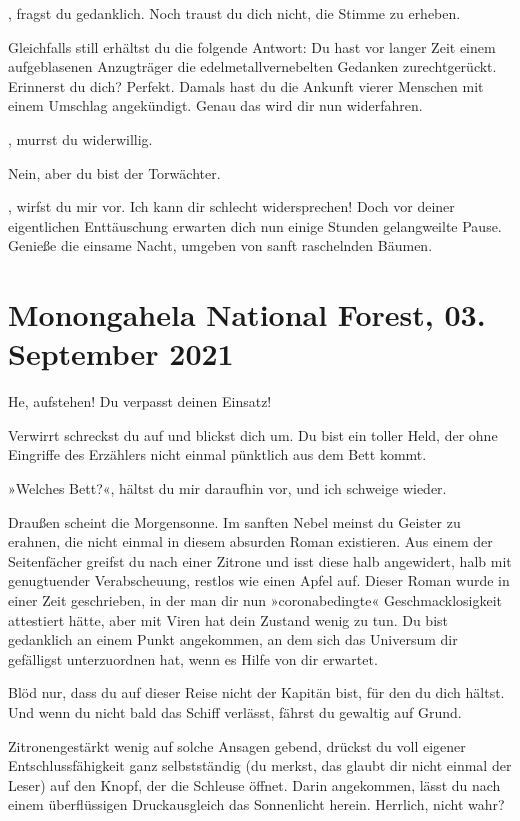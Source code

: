 , fragst du gedanklich. Noch traust du dich nicht, die Stimme zu erheben.

Gleichfalls still erhältst du die folgende Antwort: Du hast vor langer Zeit einem aufgeblasenen Anzugträger die edelmetallvernebelten Gedanken zurechtgerückt. Erinnerst du dich? Perfekt. Damals hast du die Ankunft vierer Menschen mit einem Umschlag angekündigt. Genau das wird dir nun widerfahren.

, murrst du widerwillig.

Nein, aber du bist der Torwächter.

, wirfst du mir vor. Ich kann dir schlecht widersprechen! Doch vor deiner eigentlichen Enttäuschung erwarten dich nun einige Stunden gelangweilte Pause. Genieße die einsame Nacht, umgeben von sanft raschelnden Bäumen.


\chapter{Monongahela National Forest, 03. September 2021}

He, aufstehen! Du verpasst deinen Einsatz!

Verwirrt schreckst du auf und blickst dich um. Du bist ein toller Held, der ohne Eingriffe des Erzählers nicht einmal pünktlich aus dem Bett kommt.

»Welches Bett?«, hältst du mir daraufhin vor, und ich schweige wieder.

Draußen scheint die Morgensonne. Im sanften Nebel meinst du Geister zu erahnen, die nicht einmal in diesem absurden Roman existieren. Aus einem der Seitenfächer greifst du nach einer Zitrone und isst diese halb angewidert, halb mit genugtuender Verabscheuung, restlos wie einen Apfel auf. Dieser Roman wurde in einer Zeit geschrieben, in der man dir nun »coronabedingte« Geschmacklosigkeit attestiert hätte, aber mit Viren hat dein Zustand wenig zu tun. Du bist gedanklich an einem Punkt angekommen, an dem sich das Universum dir gefälligst unterzuordnen hat, wenn es Hilfe von dir erwartet.

Blöd nur, dass du auf dieser Reise nicht der Kapitän bist, für den du dich hältst. Und wenn du nicht bald das Schiff verlässt, fährst du gewaltig auf Grund.

Zitronengestärkt wenig auf solche Ansagen gebend, drückst du voll eigener Entschlussfähigkeit ganz selbstständig (du merkst, das glaubt dir nicht einmal der Leser) auf den Knopf, der die Schleuse öffnet. Darin angekommen, lässt du nach einem überflüssigen Druckausgleich das Sonnenlicht herein. Herrlich, nicht wahr?

